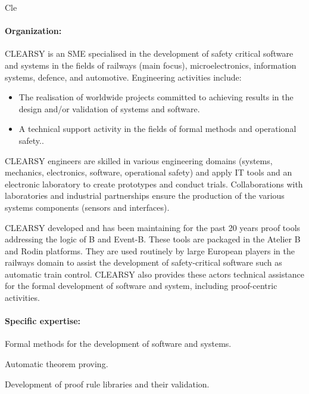 \begin{sitedescription}{Cle}


\paragraph{Organization:}

CLEARSY is an SME specialised in the development of safety critical software and systems in the fields
of railways (main focus), microelectronics, information systems, defence, and automotive. Engineering 
activities include:
\begin{itemize}
\item The realisation of worldwide projects committed to achieving results in the design and/or validation of systems and software.
\item A technical support activity in the fields of formal methods and operational safety..
\end{itemize}

CLEARSY engineers are skilled in various engineering domains (systems, mechanics, electronics, software,
operational safety) and apply IT tools and an electronic laboratory to create prototypes and
conduct trials. Collaborations with laboratories and industrial partnerships ensure the production of
the various systems components (sensors and interfaces).

CLEARSY developed and has been maintaining for the past 20 years proof tools addressing the logic of B and Event-B. These tools are 
packaged in the Atelier B and Rodin platforms. They are used routinely by large European players in the railways domain to assist the
development of safety-critical software such as automatic train control. CLEARSY also provides these actors technical assistance for the formal development of software and system, including proof-centric activities. 

\paragraph{Specific expertise:}

\begin{compactitem}
\item Formal methods for the development of software and systems.
\item Automatic theorem proving.
\item Development of proof rule libraries and their validation.
\end{compactitem}


\end{sitedescription}
